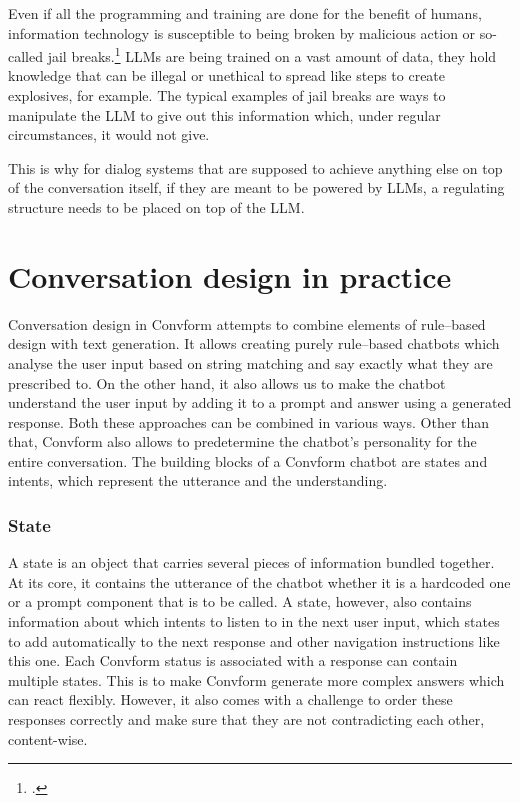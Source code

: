 \documentclass[12pt]{report}
\begin{document}
{Even if all the programming and training are done for the benefit of humans,
information technology is susceptible to being broken by malicious action
or so-called jail breaks.\footcite{zhou2024don, wei2023jailbroken}
LLMs are being trained on a vast amount of data,
they hold knowledge that can be illegal or unethical to spread
like steps to create explosives, for example.
The typical examples of jail breaks are ways to manipulate
the LLM to give out this information
which, under regular circumstances, it would not give.

This is why for dialog systems that are supposed to achieve
anything else on top of the conversation itself,
if they are meant to be powered by LLMs,
a regulating structure needs to be placed on top of the LLM.

\section{Conversation design in practice}

\par
Conversation design in Convform attempts
to combine elements of rule–based design with text generation.
It allows creating purely rule–based chatbots
which analyse the user input based on string matching
and say exactly what they are prescribed to.
On the other hand, it also allows us to make the chatbot
understand the user input by adding it to a prompt
and answer using a generated response.
Both these approaches can be combined in various ways.
Other than that, Convform also allows to predetermine
the chatbot's personality for the entire conversation.
The building blocks of a Convform chatbot are
states and intents, which represent the utterance and the understanding.

\subsubsection{State}
A state is an object that carries several pieces of information
bundled together.
At its core, it contains the utterance of the chatbot
whether it is a hardcoded one or a prompt component that is to be called.
A state, however, also contains information about
which intents to listen to in the next user input,
which states to add automatically to the next response
and other navigation instructions like this one.
Each Convform status is associated with a response
can contain multiple states.
This is to make Convform generate more complex answers
which can react flexibly.
However, it also comes with a challenge to order these responses correctly
and make sure that they are not contradicting each other, content-wise.

}
\end{document}
